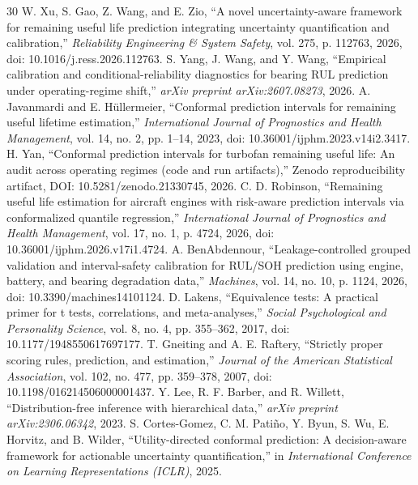 \documentclass[12pt,a4paper]{article}
\begin{document}
\begin{thebibliography}{30}
 W. Xu, S. Gao, Z. Wang, and E. Zio, ``A novel uncertainty-aware framework for remaining useful life prediction integrating uncertainty quantification and calibration,'' \textit{Reliability Engineering \& System Safety}, vol. 275, p. 112763, 2026, doi: 10.1016/j.ress.2026.112763.
 S. Yang, J. Wang, and Y. Wang, ``Empirical calibration and conditional-reliability diagnostics for bearing RUL prediction under operating-regime shift,'' \textit{arXiv preprint arXiv:2607.08273}, 2026.
 A. Javanmardi and E. H{\"u}llermeier, ``Conformal prediction intervals for remaining useful lifetime estimation,'' \textit{International Journal of Prognostics and Health Management}, vol. 14, no. 2, pp. 1--14, 2023, doi: 10.36001/ijphm.2023.v14i2.3417.
 H. Yan, ``Conformal prediction intervals for turbofan remaining useful life: An audit across operating regimes (code and run artifacts),'' Zenodo reproducibility artifact, DOI: 10.5281/zenodo.21330745, 2026.
 C. D. Robinson, ``Remaining useful life estimation for aircraft engines with risk-aware prediction intervals via conformalized quantile regression,'' \textit{International Journal of Prognostics and Health Management}, vol. 17, no. 1, p. 4724, 2026, doi: 10.36001/ijphm.2026.v17i1.4724.
 A. BenAbdennour, ``Leakage-controlled grouped validation and interval-safety calibration for RUL/SOH prediction using engine, battery, and bearing degradation data,'' \textit{Machines}, vol. 14, no. 10, p. 1124, 2026, doi: 10.3390/machines14101124.
 D. Lakens, ``Equivalence tests: A practical primer for t tests, correlations, and meta-analyses,'' \textit{Social Psychological and Personality Science}, vol. 8, no. 4, pp. 355--362, 2017, doi: 10.1177/1948550617697177.
 T. Gneiting and A. E. Raftery, ``Strictly proper scoring rules, prediction, and estimation,'' \textit{Journal of the American Statistical Association}, vol. 102, no. 477, pp. 359--378, 2007, doi: 10.1198/016214506000001437.
 Y. Lee, R. F. Barber, and R. Willett, ``Distribution-free inference with hierarchical data,'' \textit{arXiv preprint arXiv:2306.06342}, 2023.
 S. Cortes-Gomez, C. M. Pati{\~n}o, Y. Byun, S. Wu, E. Horvitz, and B. Wilder, ``Utility-directed conformal prediction: A decision-aware framework for actionable uncertainty quantification,'' in \textit{International Conference on Learning Representations (ICLR)}, 2025.
\end{thebibliography}
\end{document}
